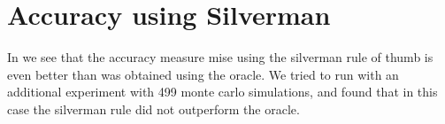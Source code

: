 \section{Accuracy using Silverman}

In  we see that the accuracy measure \gls{mise} using the \gls{silverman} rule of thumb is even better than was obtained using the \gls{oracle}.
We tried to run with an additional experiment with 499 monte carlo simulations, and found that in this case the \gls{silverman} rule did not outperform the \gls{oracle}.


